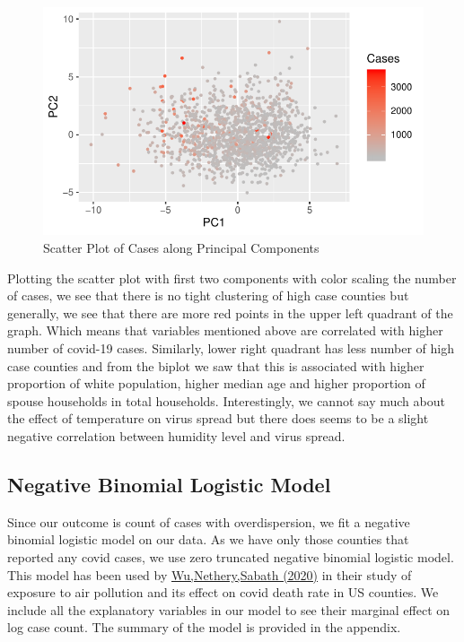 \documentclass[
]{article}
\begin{document}
\begin{figure}
\centering
\includegraphics{Final-Project-Covid-19_files/figure-latex/unnamed-chunk-6-1.pdf}
\caption{Scatter Plot of Cases along Principal Components}
\end{figure}

Plotting the scatter plot with first two components with color scaling
the number of cases, we see that there is no tight clustering of high
case counties but generally, we see that there are more red points in
the upper left quadrant of the graph. Which means that variables
mentioned above are correlated with higher number of covid-19 cases.
Similarly, lower right quadrant has less number of high case counties
and from the biplot we saw that this is associated with higher
proportion of white population, higher median age and higher proportion
of spouse households in total households. Interestingly, we cannot say
much about the effect of temperature on virus spread but there does
seems to be a slight negative correlation between humidity level and
virus spread.

\hypertarget{negative-binomial-logistic-model}{%
\subsection{Negative Binomial Logistic
Model}\label{negative-binomial-logistic-model}}

Since our outcome is count of cases with overdispersion, we fit a
negative binomial logistic model on our data. As we have only those
counties that reported any covid cases, we use zero truncated negative
binomial logistic model. This model has been used by
\href{https://www.medrxiv.org/node/78162.external-links.html}{Wu,Nethery,Sabath
(2020)} in their study of exposure to air pollution and its effect on
covid death rate in US counties. We include all the explanatory
variables in our model to see their marginal effect on log case count.
The summary of the model is provided in the appendix.
\end{document}
